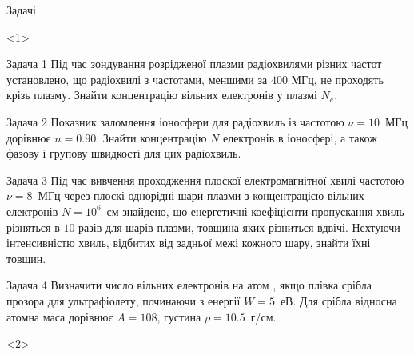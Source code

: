 \documentclass[]{beamer}
\begin{document}
\begin{frame}{Задачі}{}


	\begin{onlyenv}
		\begin{exampleblock}{\scriptsize\color{blue} Задача 1}\scriptsize\justifying
			Під час зондування розрідженої плазми радіохвилями різних частот установлено, що радіохвилі з частотами, меншими за $400$ МГц, не проходять крізь плазму. Знайти концентрацію вільних електронів у плазмі  $N_e$.%
		\end{exampleblock}

		\begin{exampleblock}{\scriptsize\color{blue} Задача 2}\scriptsize\justifying%
			Показник заломлення іоносфери для радіохвиль із частотою $ \nu= 10$~МГц дорівнює $n = 0.90$. Знайти концентрацію $N$ електронів в іоносфері, а також фазову і групову швидкості для цих радіохвиль.
		\end{exampleblock}

		\begin{exampleblock}{\scriptsize\color{blue} Задача 3}\scriptsize\justifying%
			Під час вивчення проходження плоскої електромагнітної хвилі частотою $\nu = 8$~МГц через плоскі однорідні шари плазми з концентрацією вільних електронів $N = 10^6 $~см знайдено, що енергетичні коефіцієнти пропускання хвиль різняться в $10$ разів для шарів плазми, товщина яких різниться вдвічі. Нехтуючи інтенсивністю хвиль, відбитих від задньої межі кожного шару, знайти їхні товщин.
		\end{exampleblock}


		\begin{exampleblock}{\scriptsize\color{blue} Задача 4}\scriptsize\justifying%
			Визначити число вільних електронів на атом , якщо плівка срібла прозора для ультрафіолету, починаючи з енергії $W = 5$~еВ. Для срібла відносна атомна маса дорівнює $A = 108$, густина $\rho = 10.5$~г/см.
		\end{exampleblock}
	\end{onlyenv}

	\begin{onlyenv}


\end{onlyenv}
\end{frame}
\end{document}
